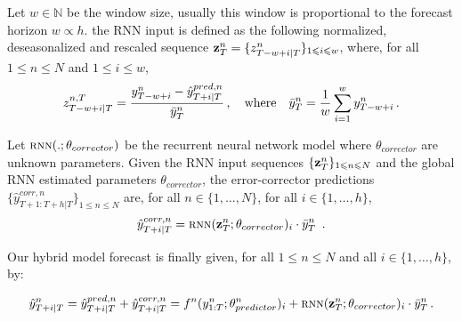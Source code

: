 \documentclass{article} %
\newcommand{\ts}{y}
\newcommand{\tspred}{\hat{\ts}}
\newcommand{\stat}{f}
\newcommand{\statparam}{\theta_{predictor}}
\newcommand{\lag}{h}
\newcommand{\window}{w}
\newcommand{\meants}{\Bar{\ts}}
\newcommand{\rnnwindow}{{\bf \rnninput}}
\newcommand{\rnninput}{z}
\newcommand{\rnn}{\textsc{rnn}}
\newcommand{\rnnparam}{\theta_{corrector}}
\begin{document}

Let $\window \in \mathbb{N}$ be the window size, usually this window is proportional to the forecast horizon $\window \propto \lag$. the RNN input is defined as the following  normalized, deseasonalized and rescaled sequence $\rnnwindow^n_T = \{\rnninput^{n}_{T-\window+i|T}\}_{1\leqslant i \leqslant w}$, where, for all $1\leqslant n \leqslant N$ and $1\leqslant i \leqslant w$, 
$$
\rnninput^{n,T}_{T-w+i|T} = \frac{\ts^n_{T-w+i} -\tspred^{pred,n}_{T+i|T}}{\meants^n_T}\,,\quad\mbox{where}\quad \meants^n_T = \frac{1}{w}\sum_{i = 1}^{w}\ts^n_{T-w+i}\,.
$$


Let $\rnn(.;\rnnparam)$ be the recurrent neural network model where $\rnnparam$ are  unknown parameters. Given the RNN input sequences $\{\rnnwindow^n_T\}_{1\leqslant n \leqslant N}$ and the global RNN estimated parameters $\rnnparam$, the error-corrector predictions $\{\tspred^{corr,n}_{T+1:T+\lag|T}\}_{1\leqslant n \leqslant N}$ are, for all $n \in \{1,\ldots,N\}$, for all $i \in \{1,\ldots,\lag\}$,
$$
\tspred^{corr,n}_{T+i|T} = \rnn(\rnnwindow^n_T;\rnnparam)_i \cdot \meants^n_T\ \,.
$$

Our hybrid model forecast is finally given, for all $1\leqslant n \leqslant N$ and all $i \in \{1,\ldots,\lag\}$, by:

\begin{equation}
\label{eq:nows:full:model}
\tspred^n_{T+i|T}  = \tspred^{pred,n}_{T+i|T} +  \tspred^{corr,n}_{T+i|T} = \stat^n(\ts^n_{1:T};\statparam^n)_i +  \rnn(\rnnwindow^n_T;\rnnparam)_i \cdot \meants^n_T\,.
\end{equation}
\end{document}
